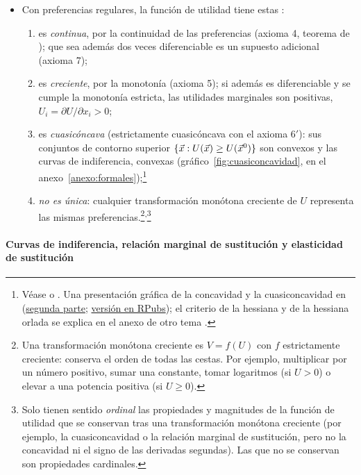 \documentclass[11pt]{article}
\begin{document}
\begin{itemize}
\item Con preferencias regulares, la función de utilidad tiene estas :
  \begin{enumerate}
  \item es \emph{continua}, por la continuidad de las preferencias (axioma 4, teorema de ); que sea además dos veces diferenciable es un supuesto adicional (axioma 7);
  \item es \emph{creciente}, por la monotonía (axioma 5); si además es diferenciable y se cumple la monotonía estricta, las utilidades marginales son positivas, $U_i=\partial U/\partial x_i>0$;
  \item es \emph{cuasicóncava} (estrictamente cuasicóncava con el axioma 6$'$): sus conjuntos de contorno superior $\{\vec{x}: U(\vec{x})\geq U(\vec{x}^0)\}$ son convexos y las curvas de indiferencia, convexas (gráfico~\ref{fig:cuasiconcavidad}, en el anexo~\ref{anexo:formales});\footnote{Véase \textcite[§3.C]{MasColellWhinstonGreen1995} o \textcite[cap.~1]{JehleReny2011Advanced}. Una presentación gráfica de la concavidad y la cuasiconcavidad en \textcite{FulekyAnatomy} (\href{https://web.archive.org/web/20260116033337/http://www2.hawaii.edu/~fuleky/anatomy/anatomy2.html}{segunda parte}; \href{http://rstudio-pubs-static.s3.amazonaws.com/2585_bcab4c39087a4220bb8b1fb4656d28b3.html}{versión en RPubs}); el criterio de la hessiana y de la hessiana orlada se explica en el anexo de otro tema .}
  \item \emph{no es única}: cualquier transformación monótona creciente de $U$ representa las mismas preferencias.\footnote{Una transformación monótona creciente es $V=f(U)$ con $f$ estrictamente creciente: conserva el orden de todas las cestas. Por ejemplo, multiplicar por un número positivo, sumar una constante, tomar logaritmos (si $U>0$) o elevar a una potencia positiva (si $U\geq 0$).}\textsuperscript{,}\footnote{Solo tienen sentido \emph{ordinal} las propiedades y magnitudes de la función de utilidad que se conservan tras una transformación monótona creciente (por ejemplo, la cuasiconcavidad o la relación marginal de sustitución, pero no la concavidad ni el signo de las derivadas segundas). Las que no se conservan son propiedades cardinales.}
  \end{enumerate}
\end{itemize}

\paragraph{Curvas de indiferencia, relación marginal de sustitución y elasticidad de sustitución}
\end{document}
